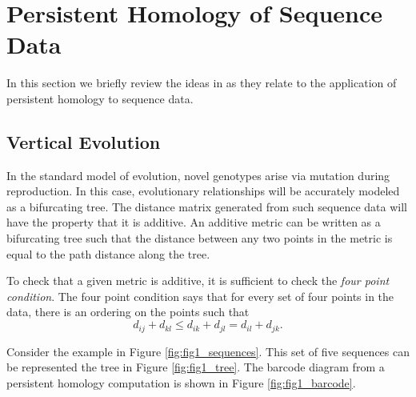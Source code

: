 \section{Persistent Homology of Sequence Data}
\label{sec:background}

In this section we briefly review the ideas in \citet{Chan:2013} as they relate to the application of persistent homology to sequence data.

\subsection{Vertical Evolution}
\label{subsec:vertical_evolution}
%
In the standard model of evolution, novel genotypes arise via mutation during reproduction.
In this case, evolutionary relationships will be accurately modeled as a bifurcating tree.
The distance matrix generated from such sequence data will have the property that it is additive.
An additive metric can be written as a bifurcating tree such that the distance between any two points in the metric is equal to the path distance along the tree.

To check that a given metric is additive, it is sufficient to check the \emph{four point condition}.
The four point condition says that for every set of four points in the data, there is an ordering on the points such that
\begin{equation}
d_{ij}+d_{kl} \leq d_{ik}+d_{jl} = d_{il}+d_{jk}.
\end{equation}

Consider the example in Figure \ref{fig:fig1_sequences}.
This set of five sequences can be represented the tree in Figure \ref{fig:fig1_tree}.
The barcode diagram from a persistent homology computation is shown in Figure \ref{fig:fig1_barcode}.

